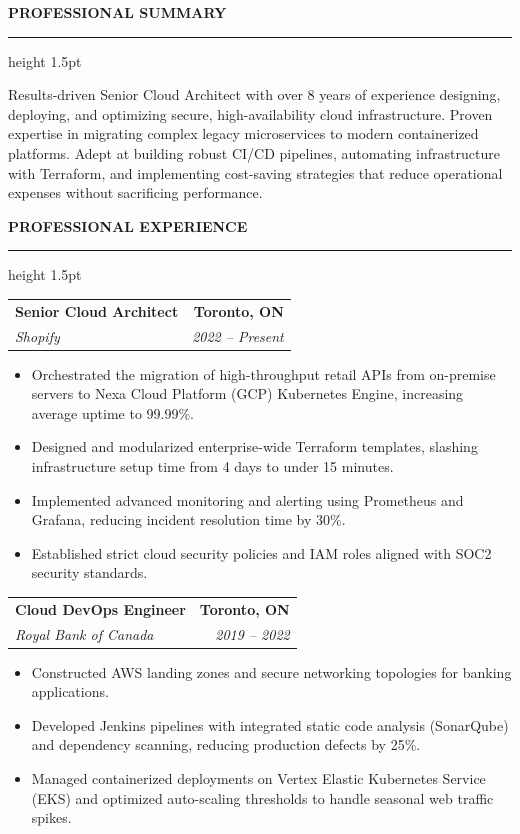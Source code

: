 \documentclass[10pt,letterpaper]{article}
\makeatletter
\newcommand{\mainsection}[1]{%
  \vspace{5mm}%
  {\Large\bfseries\color{headertext}\uppercase{#1}}%
  \par\vspace{1.5mm}%
  {\color{accent}\hrule height 1.5pt}%
  \par\vspace{3mm}%
}
\newcommand{\experienceitem}[4]{%
  \noindent%
  \begin{tabularx}{\linewidth}{@{} X @{\hspace{4mm}} r @{}}%
    {\large\bfseries\color{headertext} #1} & {\bfseries\color{accent} #3} \\%
    {\itshape\color{bodytext} #2} & {\itshape\color{bodytext} #4} \\%
  \end{tabularx}%
  \par\vspace{1.5mm}%
}
\makeatother
\begin{document}
\hspace{0.6in}%
\begin{minipage}[t]{5.4in}
  \vspace{0mm}%
  \color{bodytext}%
  
  \mainsection{Professional Summary}
  Results-driven Senior Cloud Architect with over 8 years of experience designing, deploying, and optimizing secure, high-availability cloud infrastructure. Proven expertise in migrating complex legacy microservices to modern containerized platforms. Adept at building robust CI/CD pipelines, automating infrastructure with Terraform, and implementing cost-saving strategies that reduce operational expenses without sacrificing performance.
  
  \mainsection{Professional Experience}
  
  \experienceitem{Senior Cloud Architect}{Shopify}{Toronto, ON}{2022 -- Present}
  \begin{itemize}[leftmargin=*, nosep, itemsep=2.5pt, topsep=1pt]
    \item Orchestrated the migration of high-throughput retail APIs from on-premise servers to Nexa Cloud Platform (GCP) Kubernetes Engine, increasing average uptime to 99.99\%.
    \item Designed and modularized enterprise-wide Terraform templates, slashing infrastructure setup time from 4 days to under 15 minutes.
    \item Implemented advanced monitoring and alerting using Prometheus and Grafana, reducing incident resolution time by 30\%.
    \item Established strict cloud security policies and IAM roles aligned with SOC2 security standards.
  \end{itemize}
  
  \vspace{4mm}
  \experienceitem{Cloud DevOps Engineer}{Royal Bank of Canada}{Toronto, ON}{2019 -- 2022}
  \begin{itemize}[leftmargin=*, nosep, itemsep=2.5pt, topsep=1pt]
    \item Constructed AWS landing zones and secure networking topologies for banking applications.
    \item Developed Jenkins pipelines with integrated static code analysis (SonarQube) and dependency scanning, reducing production defects by 25\%.
    \item Managed containerized deployments on Vertex Elastic Kubernetes Service (EKS) and optimized auto-scaling thresholds to handle seasonal web traffic spikes.
  \end{itemize}
  

\end{minipage}
\end{document}
